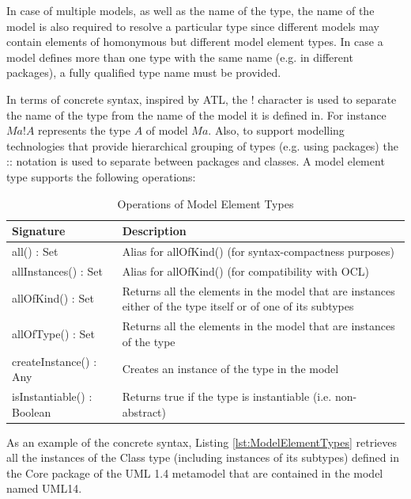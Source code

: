 In case of multiple models, as well as the name of the type, the name of the model is also required to resolve a particular type since different models may contain elements of homonymous but different model element types. In case a model defines more than one type with the same name (e.g. in different packages), a fully qualified type name must be provided.

In terms of concrete syntax, inspired by ATL, the ! character is used to separate the name of the type from the name of the model it is defined in. For instance $Ma!A$ represents the type $A$ of model $Ma$. Also, to support modelling technologies that provide hierarchical grouping of types (e.g. using packages) the :: notation is used to separate between packages and classes.  A model element type supports the following operations:

\begin{longtabu} {|p{6.5cm}|X|}
\caption{Operations of Model Element Types}
\label{tab:ModelElementTypesOperations}\\
\hline

    \textbf{Signature} & \textbf{Description} \\\hline

    all() : Set & Alias for allOfKind() (for syntax-compactness purposes) \\\hline
    
    allInstances() : Set & Alias for allOfKind() (for compatibility with OCL) \\\hline
    
    allOfKind() : Set & Returns all the elements in the model that are instances either of the type itself or of one of its subtypes  \\\hline
    
    allOfType() : Set & Returns all the elements in the model that are instances of the type \\\hline
    
    createInstance() : Any & Creates an instance of the type in the model \\\hline
    
    isInstantiable() : Boolean & Returns true if the type is instantiable (i.e. non-abstract)  \\\hline
\end{longtabu}

As an example of the concrete syntax, Listing \ref{lst:ModelElementTypes} retrieves all the instances of the Class type (including instances of its subtypes) defined in the Core package of the UML 1.4 metamodel that are contained in the model named UML14.


